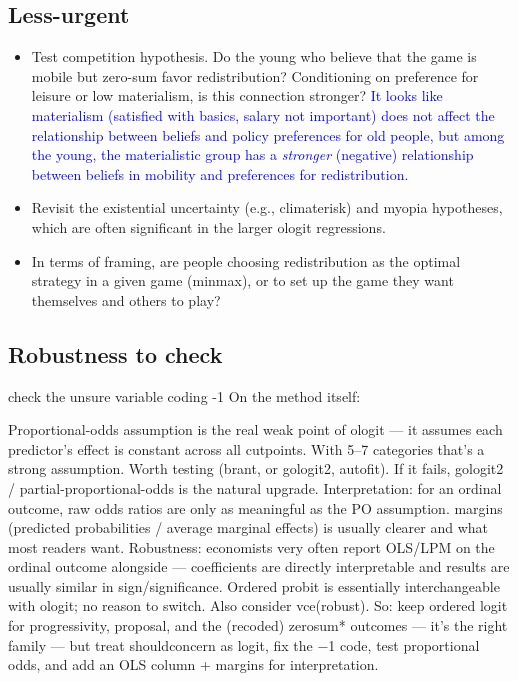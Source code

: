 \documentclass{article}
\newcommand{\blue}[1]{\textcolor{blue}{#1}}
\begin{document}
\subsection*{Less-urgent}
\begin{itemize}
    \item Test competition hypothesis. Do the young who believe that the game is mobile but zero-sum favor redistribution? Conditioning on preference for leisure or low materialism, is this connection stronger? \blue{It looks like materialism (satisfied with basics, salary not important) does not affect the relationship between beliefs and policy preferences for old people, but among the young, the materialistic group has a \textit{stronger} (negative) relationship between beliefs in mobility and preferences for redistribution.}
    \item Revisit the existential uncertainty (e.g., climaterisk) and myopia hypotheses, which are often significant in the larger ologit regressions.
    \item In terms of framing, are people choosing redistribution as the optimal strategy in a given game (minmax), or to set up the game they want themselves and others to play?
\end{itemize}

\subsection*{Robustness to check}

check the unsure variable coding -1
On the method itself:

Proportional-odds assumption is the real weak point of ologit — it assumes each predictor's effect is constant across all cutpoints. With 5–7 categories that's a strong assumption. Worth testing (brant, or gologit2, autofit). If it fails, gologit2 / partial-proportional-odds is the natural upgrade.
Interpretation: for an ordinal outcome, raw odds ratios are only as meaningful as the PO assumption. margins (predicted probabilities / average marginal effects) is usually clearer and what most readers want.
Robustness: economists very often report OLS/LPM on the ordinal outcome alongside — coefficients are directly interpretable and results are usually similar in sign/significance. Ordered probit is essentially interchangeable with ologit; no reason to switch. Also consider vce(robust).
So: keep ordered logit for progressivity, proposal, and the (recoded) zerosum* outcomes — it's the right family — but treat shouldconcern as logit, fix the −1 code, test proportional odds, and add an OLS column + margins for interpretation.
\end{document}
